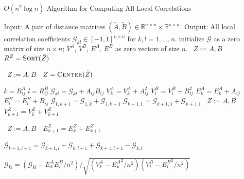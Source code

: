 \documentclass[11pt]{article}
\newcommand{\Real}{\mathbb{R}}
\newcommand{\G}{\mathcal{G}}
\newcommand{\Linefor}[2]{%
    \State \algorithmicfor\ {#1}\ \algorithmicdo\ {#2} \algorithmicend\ \algorithmicfor%
}
\begin{document}
\begin{algorithm}
\caption{$O(n^2 \log n)$ Algorithm for Computing All Local Correlations}
\label{alg2}
\begin{algorithmic}[1]
\Statex Input: A pair of distance matrices $(\tilde{A},\tilde{B}) \in \Real^{n \times n} \times \Real^{n \times n}$.
\Statex Output: All local correlation coefficients $\G_{kl} \in [-1,1]^{n \times n}$ for $k,l=1,\ldots,n$.
\State initialize $\G$ as a zero matrix of size $n \times n$; $V^{A}$, $V^{B}$, $E^{A}$, $E^{B}$ as zero vectors of size $n$.
\Linefor{$Z:=A,B$}{$R^{Z}=\textsc{Sort}(\tilde{Z})$} 
\Linefor{$Z:=A,B$}{$Z=\textsc{Center}(\tilde{Z})$} 
\State $k=R^{A}_{ij}$
\State $l=R^{B}_{ij}$
\State $\G_{kl}=\G_{kl}+A_{ij}B_{ij}$
\State $V^{A}_{k}=V^{A}_{k}+A_{ij}^2$
\State $V^{B}_{l}=V^{B}_{l}+B_{ij}^2$
\State $E^{A}_{k}=E^{A}_{k}+A_{ij}$ 
\State $E^{B}_{l}=E^{B}_{l}+B_{ij}$
\EndFor
\Statex {}
\State $\G_{1, k+1}=\G_{1, k}+\G_{1, k+1}$
\State $\G_{k+1,1}=\G_{k+1,1}+\G_{k+1,1}$
\Linefor{$Z:=A,B$}{$V^{Z}_{k+1}=V^{Z}_{k}+V^{Z}_{k+1}$} 
\Linefor{$Z:=A,B$}{$E^{Z}_{k+1}=E^{Z}_{k}+E^{Z}_{k+1}$} 
\EndFor

\State $\G_{k+1,l+1}=\G_{k+1,l}+\G_{k,l+1}+\G_{k+1,l+1}-\G_{k,l}$
\EndFor

 
\State $\G_{kl}=\left(\G_{kl}-E^{A}_{k}E^{B}_{l}/n^2\right)/\sqrt{\left(V^{A}_{k}-{E^{A}_{k}}^2/n^2\right) \left(V^{B}_{l}-{E^{B}_{l}}^2/n^2\right)}$
\EndFor
\EndFunction
\end{algorithmic}
\end{algorithm}
\end{document}
